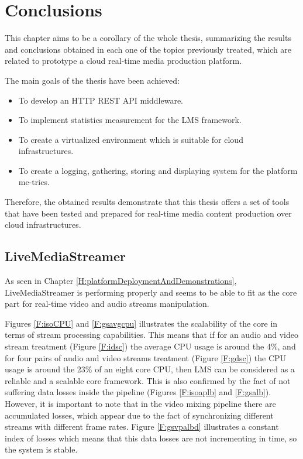 \chapter{Conclusions}\label{C:conclusions}

This chapter aims to be a corollary of the whole thesis, summarizing the results and conclusions obtained in each one of the topics previously treated, which are related to prototype a cloud real-time media production platform.

The main goals of the thesis have been achieved:

\begin{itemize}
\item To develop an HTTP REST API middleware.
\item To implement statistics measurement for the LMS framework.
\item To create a virtualized environment which is suitable for cloud infrastructures.
\item To create a logging, gathering, storing and displaying system for the platform me-trics.
\end{itemize}

Therefore, the obtained results demonstrate that this thesis offers a set of tools that have been tested and prepared for real-time media content production over cloud infrastructures.

\section{LiveMediaStreamer}

As seen in Chapter \ref{H:platformDeploymentAndDemonstrations}, LiveMediaStreamer is performing properly and seems to be able to fit as the core part for real-time video and audio streams manipulation.

Figures \ref{F:isoCPU} and \ref{F:gsavgcpu} illustrates the scalability of the core in terms of stream processing capabilities. This means that if for an audio and video stream treatment (Figure \ref{F:idsc}) the average CPU usage is around the 4\%, and for four pairs of audio and video streams treatment (Figure \ref{F:gdsc}) the CPU usage is around the 23\% of an eight core CPU, then LMS can be considered as a reliable and a scalable core framework. This is also confirmed by the fact of not suffering data losses inside the pipeline (Figures \ref{F:isoaplb} and \ref{F:gsalb}). However, it is important to note that in the video mixing pipeline there are accumulated losses, which appear due to the fact of synchronizing different streams with different frame rates. Figure \ref{F:gsvpalbd} illustrates a constant index of losses which means that this data losses are not incrementing in time, so the system is stable.

